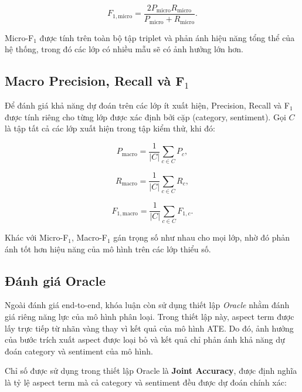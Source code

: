 \begin{equation}
F_{1,\mathrm{micro}}
=
\frac{2P_{\mathrm{micro}}R_{\mathrm{micro}}}
{P_{\mathrm{micro}}+R_{\mathrm{micro}}}.
\end{equation}

Micro-F$_1$ được tính trên toàn bộ tập triplet và phản ánh hiệu năng tổng
thể của hệ thống, trong đó các lớp có nhiều mẫu sẽ có ảnh hưởng lớn hơn.

\subsection{Macro Precision, Recall và F$_1$}

Để đánh giá khả năng dự đoán trên các lớp ít xuất hiện, Precision,
Recall và F$_1$ được tính riêng cho từng lớp được xác định bởi cặp
(category, sentiment). Gọi $C$ là tập tất cả các lớp xuất hiện trong tập
kiểm thử, khi đó:

\begin{equation}
P_{\mathrm{macro}}
=
\frac{1}{|C|}
\sum_{c\in C}P_c,
\end{equation}

\begin{equation}
R_{\mathrm{macro}}
=
\frac{1}{|C|}
\sum_{c\in C}R_c,
\end{equation}

\begin{equation}
F_{1,\mathrm{macro}}
=
\frac{1}{|C|}
\sum_{c\in C}F_{1,c}.
\end{equation}

Khác với Micro-F$_1$, Macro-F$_1$ gán trọng số như nhau cho mọi lớp,
nhờ đó phản ánh tốt hơn hiệu năng của mô hình trên các lớp thiểu số.

\subsection{Đánh giá Oracle}

Ngoài đánh giá end-to-end, khóa luận còn sử dụng thiết lập
\textit{Oracle} nhằm đánh giá riêng năng lực của mô hình phân loại.
Trong thiết lập này, aspect term được lấy trực tiếp từ nhãn vàng thay vì
kết quả của mô hình ATE. Do đó, ảnh hưởng của bước trích xuất aspect
được loại bỏ và kết quả chỉ phản ánh khả năng dự đoán category và
sentiment của mô hình.

Chỉ số được sử dụng trong thiết lập Oracle là \textbf{Joint Accuracy},
được định nghĩa là tỷ lệ aspect term mà cả category và sentiment đều
được dự đoán chính xác:

